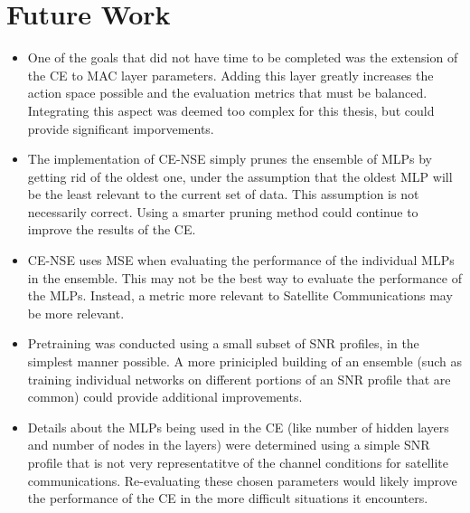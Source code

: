 \section{Future Work}
\begin{itemize}
\item One of the goals that did not have time to be completed was the extension of the CE to MAC layer parameters.  Adding this layer greatly increases the action space possible and the evaluation metrics that must be balanced. Integrating this aspect was deemed too complex for this thesis, but could provide significant imporvements.
\item The implementation of CE-NSE simply prunes the ensemble of MLPs by getting rid of the oldest one, under the assumption that the oldest MLP will be the least relevant to the current set of data. This assumption is not necessarily correct. Using a smarter pruning method could continue to improve the results of the CE.
\item CE-NSE uses MSE when evaluating the performance of the individual MLPs in the ensemble. This may not be the best way to evaluate the performance of the MLPs. Instead, a metric more relevant to Satellite Communications may be more relevant.
\item Pretraining was conducted using a small subset of SNR profiles, in the simplest manner possible. A more prinicipled building of an ensemble (such as training individual networks on different portions of an SNR profile that are common) could provide additional improvements.
\item Details about the MLPs being used in the CE (like number of hidden layers and number of nodes in the layers) were determined using a simple SNR profile that is not very representatitve of the channel conditions for satellite communications. Re-evaluating these chosen parameters would likely improve the performance of the CE in the more difficult situations it encounters.
\end{itemize}